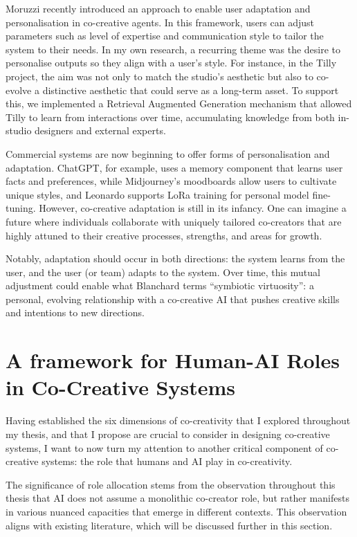 Moruzzi \cite{Moruzzi2024-cq} recently introduced an approach to enable user adaptation and personalisation in co-creative agents. In this framework, users can adjust parameters such as level of expertise and communication style to tailor the system to their needs. In my own research, a recurring theme was the desire to personalise outputs so they align with a user’s style. For instance, in the Tilly project, the aim was not only to match the studio’s aesthetic but also to co-evolve a distinctive aesthetic that could serve as a long-term asset. To support this, we implemented a Retrieval Augmented Generation mechanism that allowed Tilly to learn from interactions over time, accumulating knowledge from both in-studio designers and external experts.

Commercial systems are now beginning to offer forms of personalisation and adaptation. ChatGPT, for example, uses a memory component that learns user facts and preferences, while Midjourney’s moodboards allow users to cultivate unique styles, and Leonardo supports LoRa training for personal model fine-tuning. However, co-creative adaptation is still in its infancy. One can imagine a future where individuals collaborate with uniquely tailored co-creators that are highly attuned to their creative processes, strengths, and areas for growth.

Notably, adaptation should occur in both directions: the system learns from the user, and the user (or team) adapts to the system. Over time, this mutual adjustment could enable what Blanchard \cite{Blanchard2024-jz} terms “symbiotic virtuosity”: a personal, evolving relationship with a co-creative AI that pushes creative skills and intentions to new directions.

\section{A framework for Human-AI Roles in Co-Creative Systems}

Having established the six dimensions of co-creativity that I explored throughout my thesis, and that I propose are crucial to consider in designing co-creative systems, I want to now turn my attention to another critical component of co-creative systems: the role that humans and AI play in co-creativity.

The significance of role allocation stems from the observation throughout this thesis that AI does not assume a monolithic co-creator role, but rather manifests in various nuanced capacities that emerge in different contexts. This observation aligns with existing literature, which will be discussed further in this section.

